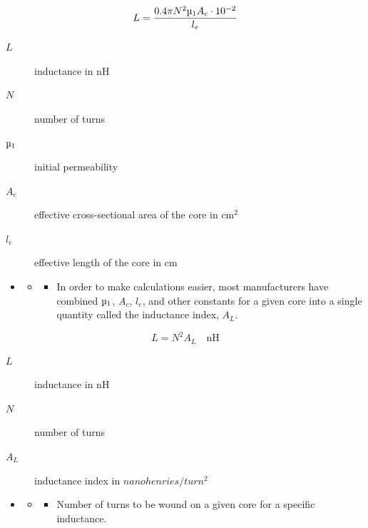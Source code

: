 \begin{equation}
L = \dfrac{0.4\pi N^2 \micro_1 A_c \cdot 10^{-2}}{l_e}
\end{equation}

\begin{description}
	\item[$L$] inductance in \si{\nano\henry}
	\item[$N$] number of turns
	\item[$\micro_1$] initial permeability
	\item[$A_e$] effective cross-sectional area of the core in $\si{\centi\meter}^2$
	\item[$l_e$] effective length of the core in \si{\centi\meter}
\end{description}

\begin{itemize}
	\item[]
	\begin{itemize}
		\item[]
		\begin{itemize}
			\item In order to make calculations easier, most manufacturers have
			combined $\micro_1$, $A_c$, $l_e$, and other constants for a given core into a	single quantity called the inductance index, $A_L$.
		\end{itemize} 
	\end{itemize} 
\end{itemize}

\begin{equation}
L = N^2 A_L \quad \si{\nano\henry}
\end{equation}

\begin{description}
	\item[$L$] inductance in \si{\nano\henry}
	\item[$N$] number of turns
	\item[$A_L$] inductance index in $nanohenries/turn^2$
\end{description}

\begin{itemize}
	\item[]
	\begin{itemize}
		\item[]
		\begin{itemize}
			\item Number of turns to be wound on a given core for a
			specific inductance.
		\end{itemize} 
	\end{itemize} 
\end{itemize}

